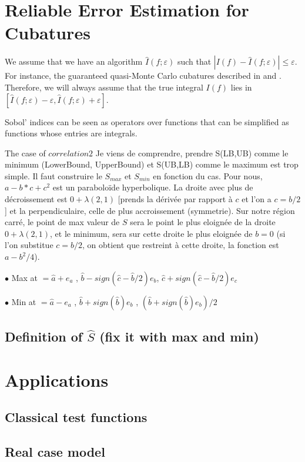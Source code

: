 \documentclass[]{elsarticle}
\theoremstyle{definition}
\def\abs#1{\ensuremath{\left \lvert #1 \right \rvert}}
\begin{document}
\section{Reliable Error Estimation for Cubatures}
We assume that we have an algorithm $\widehat{I}(f;\varepsilon)$ such that $\abs{I(f)-\widehat{I}(f;\varepsilon)}\leq \varepsilon$. For instance, the guaranteed quasi-Monte Carlo cubatures described in \cite{-} and \cite{-}. Therefore, we will always assume that the true integral $I(f)$ lies in $[\widehat{I}(f;\varepsilon)-\varepsilon,\widehat{I}(f;\varepsilon)+\varepsilon]$.

Sobol' indices can be seen as operators over functions that can be simplified as functions whose entries are integrals.

The case of $correlation 2$
Je viens de comprendre, prendre S(LB,UB) comme le minimum (LowerBound, UpperBound) et S(UB,LB) comme le maximum est trop simple. Il faut construire le $S_{max}$ et $S_{min}$ en fonction du cas.
Pour nous, $a - b*c + c^2$ est un paraboloïde hyperbolique. La droite avec plus de décroissement est $0+\lambda(2,1)$ [prends la dérivée par rapport à $c$ et l'on a $c=b/2$] et la perpendiculaire, celle de plus accroissement (symmetrie). Sur notre région carré, le point de max valeur de $S$ sera le point le plus eloignée de la droite $0+\lambda(2,1)$, et le minimum, sera sur cette droite le plus eloignée de $b = 0$ (si l'on substitue $c=b/2$, on obtient que restreint à cette droite, la fonction est $a-b^2/4$).

$\bullet$ Max at $= \hat{a} + e_a$  ,  $\hat{b} - sign(\hat{c}-\hat{b}/2) e_b$,  $\hat{c} + sign(\hat{c}-\hat{b}/2) e_c$

$\bullet$ Min at $= \hat{a} - e_a$  ,  $\hat{b} + sign(\hat{b}) e_b$  ,  $(\hat{b} + sign(\hat{b}) e_b)/2$
\subsection{Definition of $\widehat{S}$ (fix it with max and min)}


\section{Applications}
\subsection{Classical test functions}
\subsection{Real case model}
\end{document}
